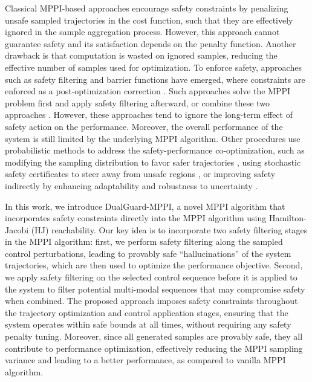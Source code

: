 Classical MPPI-based approaches encourage safety constraints by penalizing unsafe sampled trajectories in the cost function, such that they are effectively ignored in the sample aggregation process.
However, this approach cannot guarantee safety and its satisfaction depends on the penalty function. Another drawback is that computation is wasted on ignored samples, reducing the effective number of samples used for optimization.
To enforce safety, approaches such as safety filtering and barrier functions have emerged, where constraints are enforced as a post-optimization correction \cite{borquezFiltering2023,ames2016control}. 
Such approaches solve the MPPI problem first and apply safety filtering afterward, or combine these two approaches \cite{mppi_theory,mppi_shield,wabersich2021predictive}.%
However, these approaches tend to ignore the long-term effect of safety action on the performance. 
Moreover, the overall performance of the system is still limited by the underlying MPPI algorithm. 
Other procedures use probabilistic methods to address the safety-performance co-optimization, such as modifying the sampling distribution to favor safer trajectories \cite{safe_importance_sampling}, using stochastic safety certificates to steer away from unsafe regions \cite{learn_stochastic_barrier}, or improving safety indirectly by enhancing adaptability and robustness to uncertainty \cite{proactive_mppi, unscented_mppi}.

In this work, we introduce DualGuard-MPPI, a novel MPPI algorithm that incorporates safety constraints directly into the MPPI algorithm using Hamilton-Jacobi (HJ) reachability. 
Our key idea is to incorporate two safety filtering stages in the MPPI algorithm: first, we perform safety filtering along the sampled control perturbations, leading to provably safe ``hallucinations'' of the system trajectories, which are then used to optimize the performance objective. 
Second, we apply safety filtering on the selected control sequence before it is applied to the system to filter potential multi-modal sequences that may compromise safety when combined.
The proposed approach imposes safety constraints
throughout the trajectory optimization and control application stages, ensuring that the system operates within safe bounds at all times, without requiring any safety penalty tuning.
Moreover, since all generated samples are provably safe, they all contribute to performance optimization, effectively reducing the MPPI sampling variance and leading to a better performance, as compared to vanilla MPPI algorithm.   

